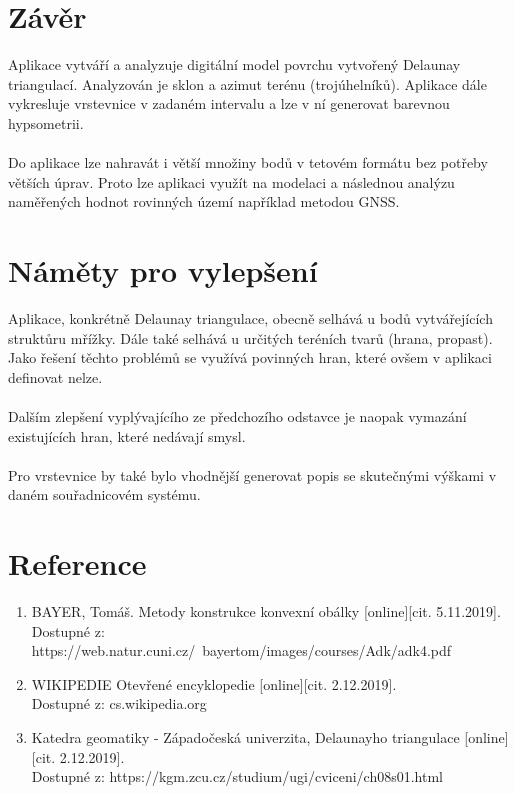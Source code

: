 \documentclass[a4paper, 12pt]{article}
\begin{document}
\clearpage

\section{Závěr}
Aplikace vytváří a analyzuje digitální model povrchu vytvořený Delaunay triangulací. Analyzován je sklon a azimut terénu (trojúhelníků). Aplikace dále vykresluje vrstevnice v zadaném intervalu a lze v ní generovat barevnou hypsometrii. \\
\\
Do aplikace lze nahravát i větší množiny bodů v tetovém formátu bez potřeby větších úprav. Proto lze aplikaci využít na modelaci a následnou analýzu naměřených hodnot rovinných území například metodou GNSS.

\section{Náměty pro vylepšení} 
Aplikace, konkrétně Delaunay triangulace, obecně selhává u bodů vytvářejících struktůru mřížky. Dále také selhává u určitých teréních tvarů (hrana, propast). Jako řešení těchto problémů se využívá povinných hran, které ovšem v aplikaci definovat nelze.\\
\\
Dalším zlepšení vyplývajícího ze předchozího odstavce je naopak vymazání existujících hran, které nedávají smysl.\\
\\
Pro vrstevnice by také bylo vhodnější generovat popis se skutečnými výškami v daném souřadnicovém systému. 

\section{Reference}

\begin{enumerate}

\item  BAYER, Tomáš. Metody konstrukce konvexní obálky [online][cit. 5.11.2019]. \\
Dostupné z: https://web.natur.cuni.cz/~bayertom/images/courses/Adk/adk4.pdf \\

\item  WIKIPEDIE Otevřené encyklopedie [online][cit. 2.12.2019]. \\
Dostupné z: cs.wikipedia.org\\

\item  Katedra geomatiky - Západočeská univerzita, Delaunayho triangulace [online][cit. 2.12.2019]. \\
Dostupné z: https://kgm.zcu.cz/studium/ugi/cviceni/ch08s01.html  \\

\end{enumerate}
\end{document}
